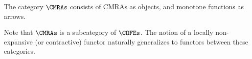 \begin{defn}
  The category $\CMRAs$ consists of CMRAs as objects, and monotone functions as arrows.
\end{defn}
Note that $\CMRAs$ is a subcategory of $\COFEs$.
The notion of a locally non-expansive (or contractive) functor naturally generalizes to functors between these categories.


